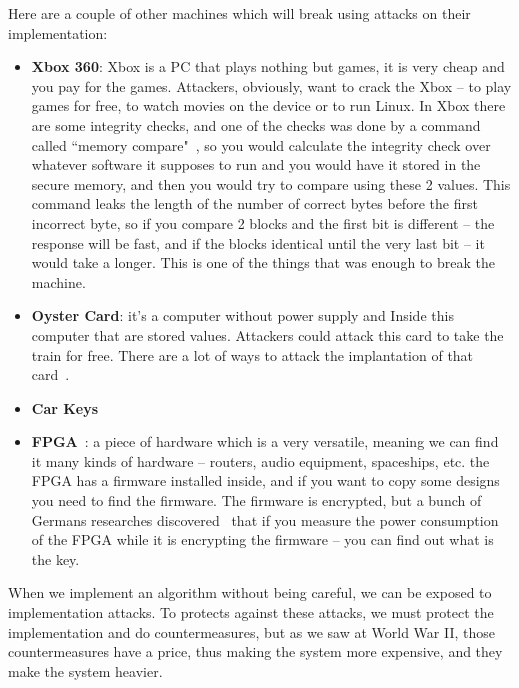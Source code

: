 Here are a couple of other machines which will break using attacks on their
implementation:

\begin{itemize}
    \item \textbf{Xbox 360}: Xbox is a PC that plays nothing but games, it is
    very cheap and you pay for the games. Attackers, obviously, want to crack
    the Xbox – to play games for free, to watch movies on the device or to run
    Linux. In Xbox there are some integrity checks, and one of the checks was
    done by a command called ``memory compare"~\cite{memcmp}, so you would
    calculate the integrity check over whatever software it supposes to run and
    you would have it stored in the secure memory, and then you would try to
    compare using these 2 values. This command leaks the length of the number of
    correct bytes before the first incorrect byte, so if you compare 2 blocks
    and the first bit is different – the response will be fast, and if the
    blocks identical until the very last bit – it would take a longer. This is
    one of the things that was enough to break the machine. 
    \item \textbf{Oyster Card}: it's a computer without power supply and Inside
    this computer that are stored values. Attackers could attack this card to
    take the train for free. There are a lot of ways to attack the implantation
    of that card~\cite{garcia2008dismantling, courtois2008algebraic}.
    \item \textbf{Car Keys}~\cite{relayAttack}
    \item \textbf{FPGA}~\cite{fpga}: a piece of hardware which is a very
    versatile, meaning we can find it many kinds of hardware – routers, audio
    equipment, spaceships, etc. the FPGA has a firmware installed inside, and if
    you want to copy some designs you need to find the firmware. The firmware is
    encrypted, but a bunch of Germans researches
    discovered~\cite{moradi2011vulnerability} that if you measure the power
    consumption of the FPGA while it is encrypting the firmware – you can find
    out what is the key.
\end{itemize}

When we implement an algorithm without being careful, we can be exposed to
implementation attacks. To protects against these attacks, we must protect the
implementation and do countermeasures, but as we saw at World War II, those
countermeasures have a price, thus making the system more expensive, and they
make the system heavier.

